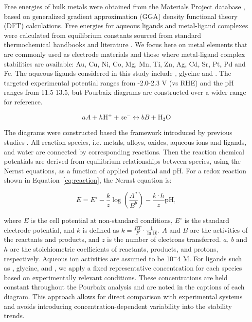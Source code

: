 \documentclass[journal=jacsat,manuscript=article]{achemso}
\begin{document}
Free energies of bulk metals were obtained from the Materials Project database \cite{Jain2013TheInnovation}, based on generalized gradient approximation (GGA) density functional theory (DFT) calculations. Free energies for aqueous ligands and metal-ligand complexes were calculated from equilibrium constants sourced from standard thermochemical handbooks \cite{Wagman1982TheUnits, Smith1989CriticalConstants, Bard2017StandardSolution, Bjerrum1957StabilitySubstances} and literature \cite{Meng1996PrinciplesReview, Azadi2019DataComplexes, Aviles2022ExploringNH3, Oraby2023SelectiveSolutions, Harrington2005DeterminationIon}. We focus here on metal elements that are commonly used as electrode materials and those where metal-ligand complex stabilities are available: Au, Cu, Ni, Co, Mg, Mn, Ti, Zn, Ag, Cd, Sr, Pt, Pd and Fe. The aqueous ligands considered in this study include , glycine and . The targeted experimental potential ranges from -2.0-2.3 V (vs RHE) and the pH ranges from 11.5-13.5, but Pourbaix diagrams are constructed over a wider range for reference.

\begin{equation} \label{eq:reaction}
aA + h\text{H}^+ + z\text{e}^- \leftrightarrow bB + \text{H}_2\text{O}
\end{equation}

The diagrams were constructed based the framework introduced by previous studies \cite{PourbaixAtlasSolutions, Huang2017ImprovedCompounds,Huang2015ElectrochemicalCalculations,Singh2017ElectrochemicalMaterials,Patel2019EfficientCompounds,Persson2012PredictionStates, Ding2018ElectrochemicalStates, Thompson2011PourbaixSystems}. All reaction species, i.e. metals, alloys, oxides, aqueous ions and ligands, and water are connected by corresponding reactions. Then the reaction chemical potentials are derived from equilibrium relationships between species, using the Nernst equations, as a function of applied potential and pH. For a redox reaction shown in Equation~\eqref{eq:reaction}, the Nernst equation is:

\begin{equation} \label{eq:nernst} E = E^\circ - \frac{k}{z} \log \left(\frac{A^a}{B^b}\right) - \frac{k \cdot h}{z} \text{pH}, \end{equation}

where \(E\) is the cell potential at non-standard conditions, \(E^\circ\) is the standard electrode potential, and $k$ is defined as \(k = \frac{RT}{F} \cdot \frac{1}{\ln 10}\). \(A\) and \(B\) are the activities of the reactants and products, and \(z\) is the number of electrons transferred. \(a\), \(b\) and \(h\) are the stoichiometric coefficients of reactants, products, and protons, respectively. Aqueous ion activities are assumed to be 10$^-4$ M. For ligands such as , glycine, and , we apply a fixed representative concentration for each species based on experimentally relevant conditions. These concentrations are held constant throughout the Pourbaix analysis and are noted in the captions of each diagram. This approach allows for direct comparison with experimental systems and avoids introducing concentration-dependent variability into the stability trends.
\end{document}
